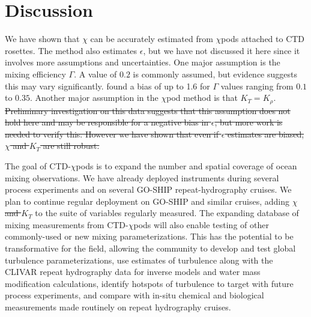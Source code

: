 \documentclass{ametsoc}
\providecommand{\DIFdel}[1]{{\protect\color{red}\sout{#1}}}                      %
\providecommand{\DIFdelbegin}{} %
\providecommand{\DIFdelend}{} %
\begin{document}
\section{Discussion}

We have shown that $\chi$ can be accurately estimated from $\chi$pods attached to CTD rosettes. The method also estimates $\epsilon$, but we have not discussed it here since it involves more assumptions and uncertainties. One major assumption is the mixing efficiency $\Gamma$. A value of $0.2$ is commonly assumed, but evidence suggests this may vary significantly. \cite{moumnash09} found a bias of up to 1.6 for $\Gamma$ values ranging from $0.1$ to $0.35$.  Another major assumption in the $\chi$pod method is that $K_T=K_{\rho}$. \DIFdelbegin \DIFdel{Preliminary investigation on this data suggests that this assumption does not hold here and may be responsible for a negative bias in $\epsilon$, but more work is needed to verify this. However we have shown that even if $\epsilon$ estimates are biased, $\chi$ and $K_T$ are still robust.
}\DIFdelend %

The goal of CTD-$\chi$pods is to expand the number and spatial coverage of ocean mixing observations. We have already deployed instruments during several process experiments and on several GO-SHIP repeat-hydrography cruises. We plan to continue regular deployment on GO-SHIP and similar cruises, adding $\chi$ \DIFdelbegin \DIFdel{and $K_T$ }\DIFdelend to the suite of variables regularly measured. The expanding database of mixing measurements from CTD-$\chi$pods will also enable testing of other commonly-used or new mixing parameterizations. This has the potential to be transformative for the field, allowing the community to 
develop and test global turbulence parameterizations, use estimates of turbulence along with the CLIVAR repeat hydrography data for inverse models and water mass modification calculations, identify hotspots of turbulence to target with future process experiments, and compare with in-situ chemical and biological measurements made routinely on repeat hydrography cruises.


\end{document}
